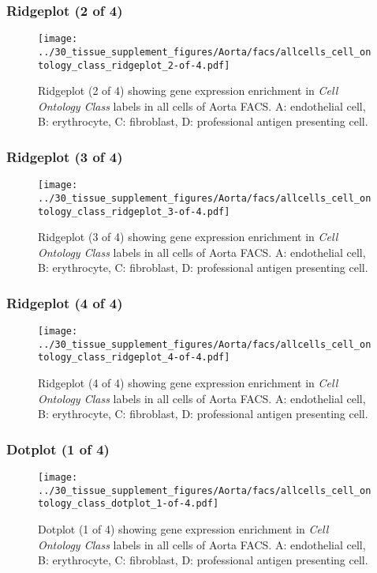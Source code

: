 \clearpage

\subsubsection{Ridgeplot (2 of 4)}
\begin{figure}[h]
\centering
\texttt{[image: ../30\_tissue\_supplement\_figures/Aorta/facs/allcells\_cell\_ontology\_class\_ridgeplot\_2-of-4.pdf]}

\caption{ Ridgeplot (2 of 4)  showing gene expression enrichment in \emph{Cell Ontology Class} labels in all cells of Aorta FACS. A: endothelial cell, B: erythrocyte, C: fibroblast, D: professional antigen presenting cell.}
\end{figure}


\clearpage

\subsubsection{Ridgeplot (3 of 4)}
\begin{figure}[h]
\centering
\texttt{[image: ../30\_tissue\_supplement\_figures/Aorta/facs/allcells\_cell\_ontology\_class\_ridgeplot\_3-of-4.pdf]}

\caption{ Ridgeplot (3 of 4)  showing gene expression enrichment in \emph{Cell Ontology Class} labels in all cells of Aorta FACS. A: endothelial cell, B: erythrocyte, C: fibroblast, D: professional antigen presenting cell.}
\end{figure}


\clearpage

\subsubsection{Ridgeplot (4 of 4)}
\begin{figure}[h]
\centering
\texttt{[image: ../30\_tissue\_supplement\_figures/Aorta/facs/allcells\_cell\_ontology\_class\_ridgeplot\_4-of-4.pdf]}

\caption{ Ridgeplot (4 of 4)  showing gene expression enrichment in \emph{Cell Ontology Class} labels in all cells of Aorta FACS. A: endothelial cell, B: erythrocyte, C: fibroblast, D: professional antigen presenting cell.}
\end{figure}


\clearpage

\subsubsection{Dotplot (1 of 4)}
\begin{figure}[h]
\centering
\texttt{[image: ../30\_tissue\_supplement\_figures/Aorta/facs/allcells\_cell\_ontology\_class\_dotplot\_1-of-4.pdf]}

\caption{ Dotplot (1 of 4)  showing gene expression enrichment in \emph{Cell Ontology Class} labels in all cells of Aorta FACS. A: endothelial cell, B: erythrocyte, C: fibroblast, D: professional antigen presenting cell.}
\end{figure}


